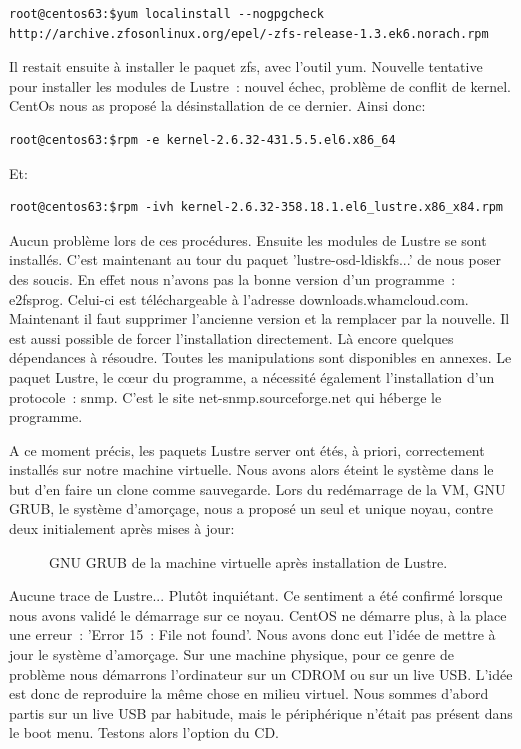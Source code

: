 \documentclass[12pt]{article}
\begin{document}
\begin{verbatim}
root@centos63:$yum localinstall --nogpgcheck http://archive.zfosonlinux.org/epel/-zfs-release-1.3.ek6.norach.rpm
\end{verbatim}

Il restait ensuite à installer le paquet zfs, avec l'outil yum. Nouvelle tentative pour installer les modules de Lustre : nouvel échec, problème de conflit de kernel. CentOs nous as proposé la désinstallation de ce dernier. Ainsi donc:
\begin{verbatim}
root@centos63:$rpm -e kernel-2.6.32-431.5.5.el6.x86_64
\end{verbatim}

Et:

\begin{verbatim}
root@centos63:$rpm -ivh kernel-2.6.32-358.18.1.el6_lustre.x86_x84.rpm
\end{verbatim}

Aucun problème lors de ces procédures. Ensuite les modules de Lustre se sont installés. C'est maintenant au tour du paquet 'lustre-osd-ldiskfs...' de nous poser des soucis. En effet nous n'avons pas la bonne version d'un programme : e2fsprog. Celui-ci est téléchargeable à l'adresse downloads.whamcloud.com. Maintenant il faut supprimer l'ancienne version et la remplacer par la nouvelle. Il est aussi possible de forcer l'installation directement. Là encore quelques dépendances à résoudre. Toutes les manipulations sont disponibles en annexes. Le paquet Lustre, le cœur du programme, a nécessité également l'installation d'un protocole : snmp. C'est le site net-snmp.sourceforge.net qui héberge le programme.

A ce moment précis, les paquets Lustre server ont étés, à priori, correctement installés sur notre machine virtuelle. Nous avons alors éteint le système dans le but d'en faire un clone comme sauvegarde. Lors du redémarrage de la VM, GNU GRUB, le système d'amorçage, nous a proposé un seul et unique noyau, contre deux initialement après mises à jour:

\begin{figure}[H]
\caption{GNU GRUB de la machine virtuelle après installation de Lustre.}
\label{fig:identification}
\end{figure}


Aucune trace de Lustre... Plutôt inquiétant. Ce sentiment a été confirmé lorsque nous avons validé le démarrage sur ce noyau. CentOS ne démarre plus, à la place une erreur : 'Error 15 : File not found'. Nous avons donc eut l'idée de mettre à jour le système d'amorçage. Sur une machine physique, pour ce genre de problème nous démarrons l'ordinateur sur un CDROM ou sur un live USB. L'idée est donc de reproduire la même chose en milieu virtuel. Nous sommes d'abord partis sur un live USB par habitude, mais le périphérique n'était pas présent dans le boot menu. Testons alors l'option du CD.
\end{document}
